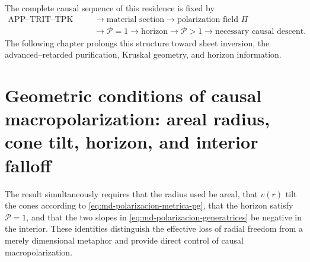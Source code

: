 The complete causal sequence of this residence is fixed by
\begin{equation}
\begin{aligned}
 \text{APP--TRIT--TPK state}
 &\longrightarrow
 \text{material section}
 \longrightarrow
 \text{polarization field }\Pi\\
 &\longrightarrow
 \mathcal P=1
 \longrightarrow
 \text{horizon}
 \longrightarrow
 \mathcal P>1
 \longrightarrow
 \text{necessary causal descent}.
\end{aligned}
 \label{eq:md-polarizacion-cadena}
\end{equation}
The following chapter prolongs this structure toward sheet inversion,
the advanced--retarded purification, Kruskal geometry, and horizon
information.

\section{Geometric conditions of causal macropolarization: areal radius, cone tilt, horizon, and interior falloff}
\label{sec:md-polarizacion-control}

The result simultaneously requires that the radius used be areal, that \(v(r)\) tilt the cones according to \eqref{eq:md-polarizacion-metrica-pg}, that the horizon satisfy \(\mathcal P=1\), and that the two slopes in \eqref{eq:md-polarizacion-generatrices} be negative in the interior. These identities distinguish the effective loss of radial freedom from a merely dimensional metaphor and provide direct control of causal macropolarization.
